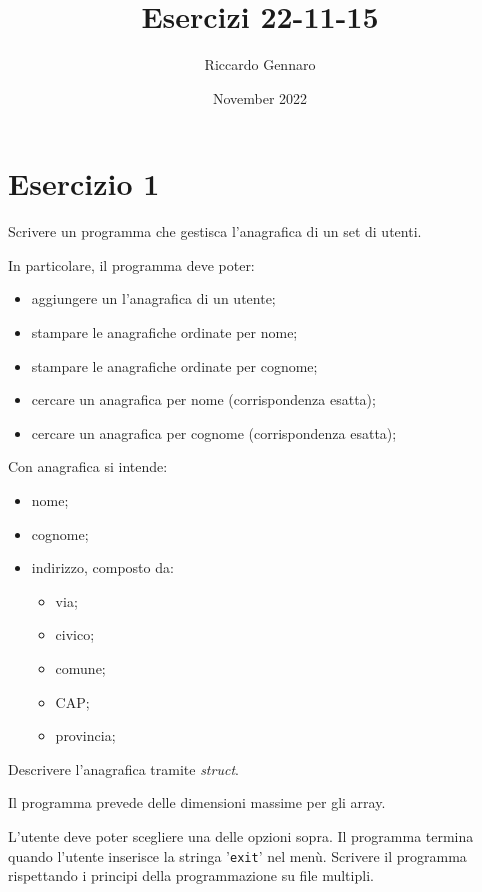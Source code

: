 \documentclass{article}
\title{Esercizi 22-11-15}
\author{Riccardo Gennaro}
\date{November 2022}
\begin{document}
\maketitle

\section*{Esercizio 1}

    Scrivere un programma che gestisca l'anagrafica di un set di utenti.

    In particolare, il programma deve poter:
    \begin{itemize}
        \item aggiungere un l'anagrafica di un utente;
        \item stampare le anagrafiche ordinate per nome;
        \item stampare le anagrafiche ordinate per cognome;
        \item cercare un anagrafica per nome (corrispondenza esatta);
        \item cercare un anagrafica per cognome (corrispondenza esatta);
    \end{itemize}

    Con anagrafica si intende:

    \begin{itemize}
        \item nome;
        \item cognome;
        \item indirizzo, composto da:
        \begin{itemize}
            \item via;
            \item civico;
            \item comune;
            \item CAP;
            \item provincia;
        \end{itemize}
    \end{itemize}

    \noindent Descrivere l'anagrafica tramite \textit{struct}.    

    \noindent Il programma prevede delle dimensioni massime per gli array.

    L'utente deve poter scegliere una delle opzioni sopra. Il programma termina quando l'utente inserisce la stringa '\texttt{exit}' nel menù.
    Scrivere il programma rispettando i principi della programmazione su file multipli. 
\end{document}
